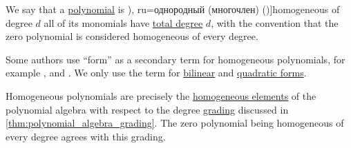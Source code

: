 \begin{definition}\label{def:homogeneous_polynomial}
  We say that a \hyperref[def:polynomial_algebra]{polynomial} is \term[bg=хомогенен (полином) (\cite[58]{ГеновМиховскиМоллов1991Алгебра}), ru=однородный (многочлен) (\cite[314]{Курош1968КурсВысшейАлгебры})]{homogeneous} of degree \( d \) all of its monomials have \hyperref[def:polynomial_degree]{total degree} \( d \), with the convention that the zero polynomial is considered homogeneous of every degree.
\end{definition}
\begin{comments}
  \item Some authors use \enquote{form} as a secondary term for homogeneous polynomials, for example \textcite[13]{Eisenbud1995CommutativeAlgebra}, \textcite[314]{Курош1968КурсВысшейАлгебры} and \textcite[2]{Обрешков1962ВисшаАлгебра}. We only use the term for \hyperref[def:bilinear_form]{bilinear} and \hyperref[def:quadratic_form]{quadratic forms}.

  \item Homogeneous polynomials are precisely the \hyperref[def:homogeneous_element]{homogeneous elements} of the polynomial algebra with respect to the degree \hyperref[def:graded_ring]{grading} discussed in \cref{thm:polynomial_algebra_grading}. The zero polynomial being homogeneous of every degree agrees with this grading.
\end{comments}

